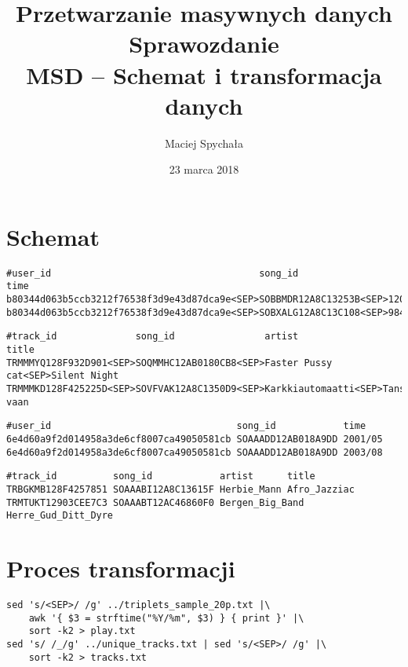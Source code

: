 \documentclass[a4paper,11pt]{article}
\author{Maciej Spychała}
\title{Przetwarzanie masywnych danych\\ 
\large{{\bf Sprawozdanie} \\ MSD -- Schemat i transformacja danych}}
\date{23 marca 2018}
\begin{document}
\maketitle 

\section{Schemat}

\begin{footnotesize}
\begin{verbatim}
#user_id                                     song_id                time
b80344d063b5ccb3212f76538f3d9e43d87dca9e<SEP>SOBBMDR12A8C13253B<SEP>1203083335
b80344d063b5ccb3212f76538f3d9e43d87dca9e<SEP>SOBXALG12A8C13C108<SEP>984663773
\end{verbatim}

\begin{verbatim}
#track_id              song_id                artist               title
TRMMMYQ128F932D901<SEP>SOQMMHC12AB0180CB8<SEP>Faster Pussy cat<SEP>Silent Night
TRMMMKD128F425225D<SEP>SOVFVAK12A8C1350D9<SEP>Karkkiautomaatti<SEP>Tanssi vaan
\end{verbatim}
\end{footnotesize}

\begin{footnotesize}
\begin{verbatim}
#user_id                                 song_id            time
6e4d60a9f2d014958a3de6cf8007ca49050581cb SOAAADD12AB018A9DD 2001/05
6e4d60a9f2d014958a3de6cf8007ca49050581cb SOAAADD12AB018A9DD 2003/08
\end{verbatim}

\begin{verbatim}
#track_id          song_id            artist      title
TRBGKMB128F4257851 SOAAABI12A8C13615F Herbie_Mann Afro_Jazziac
TRMTUKT12903CEE7C3 SOAAABT12AC46860F0 Bergen_Big_Band Herre_Gud_Ditt_Dyre
\end{verbatim}
\end{footnotesize}

\section{Proces transformacji}

\begin{verbatim}
sed 's/<SEP>/ /g' ../triplets_sample_20p.txt |\
    awk '{ $3 = strftime("%Y/%m", $3) } { print }' |\
    sort -k2 > play.txt
sed 's/ /_/g' ../unique_tracks.txt | sed 's/<SEP>/ /g' |\
    sort -k2 > tracks.txt
\end{verbatim}
\end{document}
